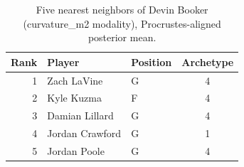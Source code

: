 \begin{table}[htbp]
  \centering\small
  \begin{tabular}{rllc}
    \toprule
    Rank & Player & Position & Archetype \\
    \midrule
    1 & Zach LaVine & G & 4 \\
    2 & Kyle Kuzma & F & 4 \\
    3 & Damian Lillard & G & 4 \\
    4 & Jordan Crawford & G & 1 \\
    5 & Jordan Poole & G & 4 \\
    \bottomrule
  \end{tabular}
  \caption{Five nearest neighbors of Devin Booker (curvature_m2 modality), Procrustes-aligned posterior mean.}
  \label{tab:Devin_Booker_neighbors_curvature_m2}
\end{table}

